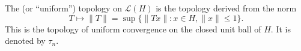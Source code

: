 \begin{definition}
The  (or ``uniform'') topology on $\mathcal{L}(H)$ is the topology derived from the norm
$$T \mapsto \|T\| = \sup \{ \|Tx\| : x \in H, \|x\| \leq 1 \}.$$
This is the topology of uniform convergence on the closed unit ball of $H$. It is denoted by $\tau_n$.
\end{definition}
